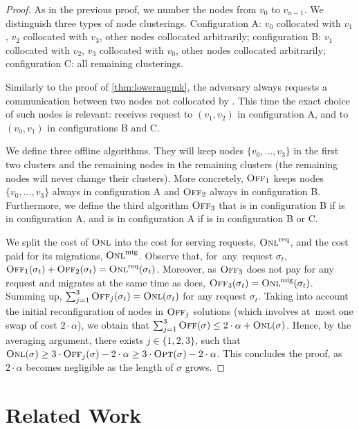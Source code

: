 \begin{proof} As in the previous proof, we number the nodes from $v_0$ to
$v_{n-1}$. We distinguish three types of node clusterings. Configuration A:
$v_0$ collocated with $v_1$, $v_2$ collocated with $v_3$, other nodes
collocated arbitrarily; configuration B: $v_1$ collocated with $v_2$, $v_3$
collocated with $v_0$, other nodes collocated arbitrarily; configuration C:
all remaining clusterings.

Similarly to the proof of \ref{thm:loweraugmk}, the adversary always
requests a communication between two nodes not collocated by \ONL.
This time the exact choice of such nodes is relevant: \ONL receives request to
$(v_1,v_2)$ in configuration A, and to $(v_0,v_1)$ in configurations B and C.

We define three offline algorithms. They will keep nodes
$\{v_0,\ldots,v_3\}$ in the first two clusters and the remaining nodes in the
remaining clusters (the remaining nodes will never change their clusters). 
More concretely, $\textsc{Off}_1$ keeps nodes $\{v_0,\ldots,v_3\}$ always in
configuration A and $\textsc{Off}_2$ always in configuration B. Furthermore, we define
the third algorithm $\textsc{Off}_3$ that is in configuration B if \ONL is in
configuration A, and is in configuration A if \ONL is in configuration B or C.

We split the cost of $\textsc{Onl}$ into the cost for serving requests, $\textsc{Onl}^\textnormal{req}$, and
the cost paid for its migrations, $\textsc{Onl}^\textnormal{mig}$. Observe that, for~any~request
$\sigma_t$, $\textsc{Off}_1(\sigma_t) + \textsc{Off}_2(\sigma_t) = \textsc{Onl}^\textnormal{req}(\sigma_t)$.
Moreover, as $\textsc{Off}_3$ does not pay for any request and migrates at the same
time as \ONL does, $\textsc{Off}_3(\sigma_t) = \textsc{Onl}^\textnormal{mig}(\sigma_t)$. Summing up,
$\sum_{j=1}^3 \textsc{Off}_j(\sigma_t) = \textsc{Onl}(\sigma_t)$ for any request $\sigma_t$.
Taking into account the initial reconfiguration of nodes in $\textsc{Off}_j$ solutions
(which involves at~most one swap of cost $2 \cdot \alpha$), we obtain that
$\sum_{j=1}^3 \textsc{Off}(\sigma) \leq 2 \cdot \alpha + \textsc{Onl}(\sigma)$. Hence, by the
averaging argument, there exists $j \in \{1,2,3\}$, such that $\textsc{Onl}(\sigma)
\geq 3 \cdot \textsc{Off}_j(\sigma) - 2 \cdot \alpha \geq 3 \cdot \textsc{Opt}(\sigma) - 
2 \cdot \alpha$. This concludes the proof, as $2 \cdot \alpha$ becomes
negligible as the length of $\sigma$ grows.
\end{proof}

\section{Related Work}
\label{sec:related-work-dynamic}

